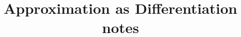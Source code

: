 \documentclass{acmart}
\begin{document}
\title{Approximation as Differentiation notes}
\maketitle
\end{document}

